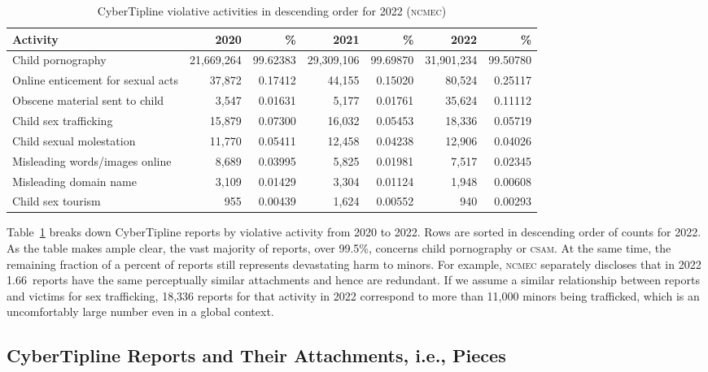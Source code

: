 \documentclass[nonacm,screen]{acmart}
\newcommand\V[1]{\textsc{\MakeLowercase{#1}}}
\begin{document}
\begin{itemize}
{\begin{table}
\centering\libertineLF
\caption{CyberTipline violative activities in descending order for 2022 (\V{NCMEC})}
\label{tab:report-contents}
\begin{tabular}{l|rr|rr|rr}
\textbf{Activity}
& \textbf{2020} & \textbf{\%}
& \textbf{2021} & \textbf{\%}
& \textbf{2022} & \textbf{\%}
\\ \hline
Child pornography & 21,669,264 & 99.62383 & 29,309,106 & 99.69870 & 31,901,234 & 99.50780 \\
Online enticement for sexual acts & 37,872 & 0.17412 & 44,155 & 0.15020 & 80,524 & 0.25117 \\
Obscene material sent to child & 3,547 & 0.01631 & 5,177 & 0.01761 & 35,624 & 0.11112 \\
Child sex trafficking & 15,879 & 0.07300 & 16,032 & 0.05453 & 18,336 & 0.05719 \\
Child sexual molestation & 11,770 & 0.05411 & 12,458 & 0.04238 & 12,906 & 0.04026 \\
Misleading words/images online & 8,689 & 0.03995 & 5,825 & 0.01981 & 7,517 & 0.02345 \\
Misleading domain name & 3,109 & 0.01429 & 3,304 & 0.01124 & 1,948 & 0.00608 \\
Child sex tourism & 955 & 0.00439 & 1,624 & 0.00552 & 940 & 0.00293 \\
\end{tabular}
\end{table}

Table~\ref{tab:report-contents} breaks down CyberTipline reports by violative
activity from 2020 to 2022. Rows are sorted in descending order of counts for
2022. As the table makes ample clear, the vast majority of reports, over 99.5\%,
concerns child pornography or \V{CSAM}. At the same time, the remaining fraction
of a percent of reports still represents devastating harm to minors. For
example, \V{NCMEC} separately discloses that in 2022 1.66~reports have the same
perceptually similar attachments and hence are redundant. If we assume a similar
relationship between reports and victims for sex trafficking, 18,336 reports for
that activity in 2022 correspond to more than 11,000 minors being trafficked,
which is an uncomfortably large number even in a global context.


\subsection{CyberTipline Reports and Their Attachments, i.e., Pieces}
\label{sec:pieces-and-reports}

}
\end{itemize}
\end{document}
